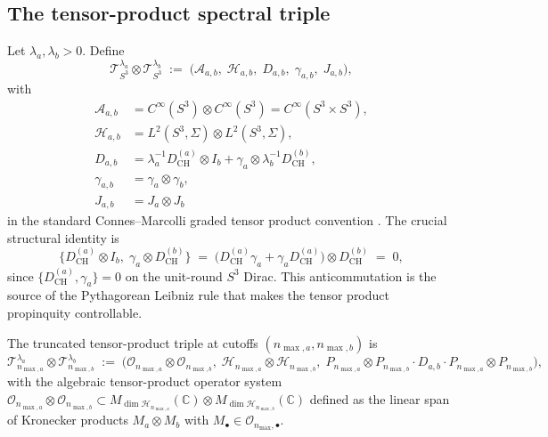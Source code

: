 \documentclass[11pt,a4paper]{article}
\theoremstyle{plain}
\theoremstyle{definition}
\newcommand{\nmax}{n_{\max}}
\newcommand{\nmaxa}{n_{\max,a}}
\newcommand{\nmaxb}{n_{\max,b}}
\newcommand{\sthree}{S^{3}}
\newcommand{\Hilb}{\mathcal{H}}
\newcommand{\Op}{\mathcal{O}}
\newcommand{\Tcal}{\mathcal{T}}
\newcommand{\Acal}{\mathcal{A}}
\newcommand{\C}{\mathbb{C}}
\newcommand{\Mat}{M}
\newcommand{\DCH}{D_{\mathrm{CH}}}
\begin{document}
\subsection{The tensor-product spectral triple}
\label{sec:tensor_triple}

Let $\lambda_a, \lambda_b > 0$. Define
\begin{equation}\label{eq:tensor_triple_def}
\Tcal_{\sthree}^{\lambda_a} \otimes \Tcal_{\sthree}^{\lambda_b}
\;:=\; \bigl(\Acal_{a,b},\; \Hilb_{a,b},\; D_{a,b},\; \gamma_{a,b},\;
J_{a,b}\bigr),
\end{equation}
with
\begin{align}
\Acal_{a,b} &= C^\infty(\sthree) \otimes C^\infty(\sthree) =
C^\infty(\sthree \times \sthree), \\
\Hilb_{a,b} &= L^2(\sthree, \Sigma) \otimes L^2(\sthree, \Sigma), \\
D_{a,b} &= \lambda_a^{-1} \DCH^{(a)} \otimes I_b
        + \gamma_a \otimes \lambda_b^{-1} \DCH^{(b)}, \label{eq:CM_dirac_recall} \\
\gamma_{a,b} &= \gamma_a \otimes \gamma_b, \\
J_{a,b} &= J_a \otimes J_b
\end{align}
in the standard Connes--Marcolli graded tensor product convention
\cite{connes1995, marcolli_vs2014}. The crucial structural identity is
\begin{equation}\label{eq:anticomm}
   \bigl\{ \DCH^{(a)} \otimes I_b,\; \gamma_a \otimes \DCH^{(b)} \bigr\}
   \;=\; \bigl(\DCH^{(a)} \gamma_a + \gamma_a \DCH^{(a)}\bigr) \otimes
         \DCH^{(b)} \;=\; 0,
\end{equation}
since $\{\DCH^{(a)}, \gamma_a\} = 0$ on the unit-round $\sthree$ Dirac.
This anticommutation is the source of the Pythagorean Leibniz rule
that makes the tensor product propinquity controllable.

The truncated tensor-product triple at cutoffs $(\nmaxa, \nmaxb)$ is
\begin{equation}\label{eq:tensor_truncated}
\Tcal_{\nmaxa}^{\lambda_a} \otimes \Tcal_{\nmaxb}^{\lambda_b}
\;:=\; \bigl(\Op_{\nmaxa} \otimes \Op_{\nmaxb},\;
\Hilb_{\nmaxa} \otimes \Hilb_{\nmaxb},\;
P_{\nmaxa} \otimes P_{\nmaxb} \cdot D_{a,b} \cdot P_{\nmaxa} \otimes
P_{\nmaxb}\bigr),
\end{equation}
with the algebraic tensor-product operator system $\Op_{\nmaxa} \otimes
\Op_{\nmaxb} \subset M_{\dim \Hilb_{\nmaxa}} (\C) \otimes
M_{\dim \Hilb_{\nmaxb}}(\C)$ defined as the linear span of Kronecker
products $\Mat_a \otimes \Mat_b$ with $\Mat_\bullet \in \Op_{\nmax,
\bullet}$.
\end{document}
